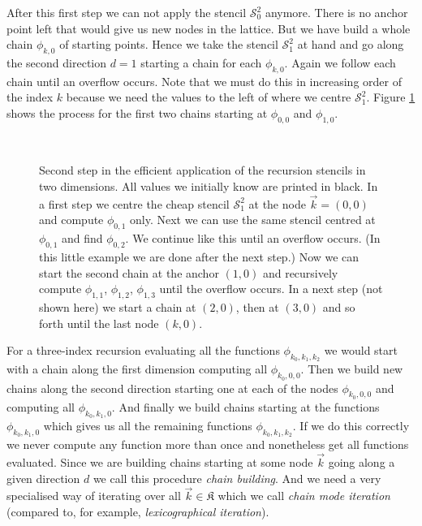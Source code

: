 After this first step we can not apply the stencil $\mathcal{S}^2_0$ anymore.
There is no anchor point left that would give us new nodes in the lattice.
But we have build a whole chain $\phi_{k, 0}$ of starting points. Hence we take
the stencil $\mathcal{S}^2_1$ at hand and go along the second direction $d=1$
starting a chain for each $\phi_{k,0}$. Again we follow each chain until an
overflow occurs. Note that we must do this in increasing order of the index $k$
because we need the values to the left of where we centre $\mathcal{S}^2_1$.
Figure \ref{fig:efficient_stencil_application_d1} shows the process for the
first two chains starting at $\phi_{0,0}$ and $\phi_{1,0}$.

\begin{figure}[h!]
  \centering
  \subfloat[][]{
    
  }
  \hspace{1cm}
  \subfloat[][]{
    
  }
 \\
  \caption[Efficient stencil application in two dimensions]{
           Second step in the efficient application of the recursion stencils
           in two dimensions. All values we initially know are printed in black.
           In a first step we centre the cheap stencil $\mathcal{S}^2_1$ at the
           node $\vec{k} = (0,0)$ and compute $\phi_{0,1}$ only. Next we can use
           the same stencil centred at $\phi_{0,1}$ and find $\phi_{0,2}$. We
           continue like this until an overflow occurs. (In this little example
           we are done after the next step.) Now we can start the second chain
           at the anchor $(1,0)$ and recursively compute $\phi_{1,1}$, $\phi_{1,2}$,
           $\phi_{1,3}$ until the overflow occurs. In a next step (not shown here)
           we start a chain at $(2,0)$, then at $(3,0)$ and so forth until
           the last node $(k,0)$.}
    \label{fig:efficient_stencil_application_d1}
\end{figure}

For a three-index recursion evaluating all the functions $\phi_{k_0,k_1,k_2}$
we would start with a chain along the first dimension computing all $\phi_{k_0, 0, 0}$.
Then we build new chains along the second direction starting one at each of the nodes
$\phi_{k_0, 0, 0}$ and computing all $\phi_{k_0, k_1, 0}$. And finally we build
chains starting at the functions $\phi_{k_0, k_1, 0}$ which gives us all the remaining
functions $\phi_{k_0, k_1, k_2}$.
If we do this correctly we never compute any function more than once and nonetheless
get all functions evaluated. Since we are building chains starting at some node $\vec{k}$
going along a given direction $d$ we call this procedure \emph{chain building}.
And we need a very specialised way of iterating over all $\vec{k} \in \mathfrak{K}$
which we call \emph{chain mode iteration} (compared to, for example, \emph{lexicographical
iteration}).

